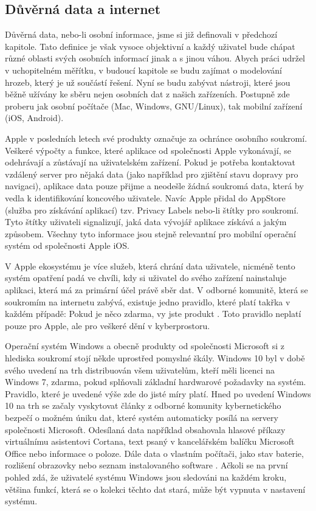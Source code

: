 \documentclass{article}
\begin{document}
\begin{spacing}{1.15}
		\section*{Důvěrná data a internet}
		Důvěrná data, nebo-li osobní informace, jsme si již definovali v předchozí kapitole. Tato definice je však vysoce objektivní a každý uživatel bude chápat různé oblasti svých osobních informací jinak a s jinou váhou. Abych práci udržel v uchopitelném měřítku, v budoucí kapitole se budu zajímat o modelování hrozeb, který je už součástí řešení. Nyní se budu zabývat nástroji, které jsou běžně užívány ke sběru nejen osobních dat z našich zařízeních. Postupně zde proberu jak osobní počítače (Mac, Windows, GNU/Linux), tak mobilní zařízení (iOS, Android).
		
		Apple v posledních letech své produkty označuje za ochránce osobního soukromí. Veškeré výpočty a funkce, které aplikace od společnosti Apple vykonávají, se odehrávají a zůstávají na uživatelském zařízení. Pokud je potřeba kontaktovat vzdálený server pro nějaká data (jako například pro zjištění stavu dopravy pro navigaci), aplikace data pouze přijme a neodešle žádná soukromá data, která by vedla k identifikování koncového uživatele. Navíc Apple přidal do AppStore (služba pro získávání aplikací) tzv. Privacy Labels nebo-li štítky pro soukromí. Tyto štítky uživateli signalizují, jaká data vývojář aplikace získává a jakým způsobem. Všechny tyto informace jsou stejně relevantní pro mobilní operační systém od společnosti Apple iOS.
		
		V Apple ekosystému je více služeb, která chrání data uživatele, nicméně tento systém opatření padá ve chvíli, kdy si uživatel do svého zařízení nainstaluje aplikaci, která má za primární účel právě sběr dat. V odborné komunitě, která se soukromím na internetu zabývá, existuje jedno pravidlo, které platí takřka v každém případě: Pokud je něco zdarma, vy jste produkt \cite{swisher2021}. Toto pravidlo neplatí pouze pro Apple, ale pro veškeré dění v kyberprostoru.
		
		Operační systém Windows a obecně produkty od společnosti Microsoft si z hlediska soukromí stojí někde uprostřed pomyslné škály. Windows 10 byl v době svého uvedení na trh distribuován všem uživatelům, kteří měli licenci na Windows 7, zdarma, pokud splňovali základní hardwarové požadavky na systém. Pravidlo, které je uvedené výše zde do jisté míry platí. Hned po uvedení Windows 10 na trh se začaly vyskytovat články z odborné komunity kybernetického bezpečí o možném úniku dat, které systém automaticky posílá na servery společnosti Microsoft. Odesílaná data například obsahovala hlasové příkazy virtuálnímu asistentovi Cortana, text psaný v kancelářském balíčku Microsoft Office nebo informace o poloze. Dále data o vlastním počítači, jako stav baterie, rozlišení obrazovky nebo seznam instalovaného software \cite{rashid2016}. Ačkoli se na první pohled zdá, že uživatelé systému Windows jsou sledováni na každém kroku, většina funkcí, která se o kolekci těchto dat stará, může být vypnuta v nastavení systému.
		

\end{spacing}
\end{document}
